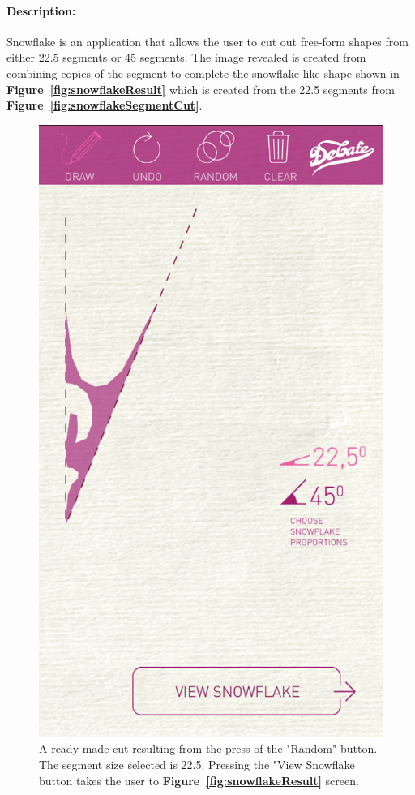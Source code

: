 \documentclass[11pt]{article}
\begin{document}
                \paragraph{Description:}
                Snowflake is an application that allows the user to cut out free-form shapes from either 22.5\textdegree{} segments or 45\textdegree{} segments. The image revealed is created from combining copies of the segment to complete the snowflake-like shape shown in \textbf{Figure~\ref{fig:snowflakeResult}} which is created from the 22.5\textdegree{} segments from \textbf{Figure~\ref{fig:snowflakeSegmentCut}}. 
                    
                    \begin{figure}[!ht]
                        \begin{minipage}{0.45\textwidth}
                            \centering \includegraphics[width=0.7\linewidth]{Images/snowflakeSegmentCut}
                            \caption{A ready made cut resulting from the press of the "Random" button. The segment size selected is 22.5\textdegree{}. Pressing the "View Snowflake button takes the user to \textbf{Figure~\ref{fig:snowflakeResult}} screen.\\}

\end{minipage}
\end{figure}
\end{document}
